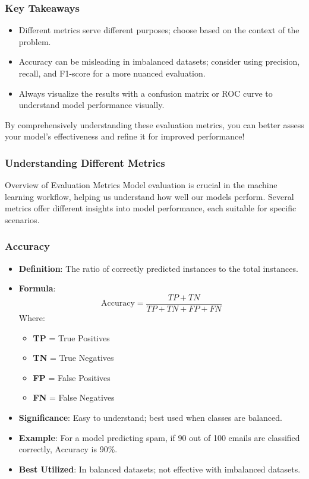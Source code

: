 \documentclass[aspectratio=169]{beamer}
\begin{document}
\begin{frame}[fragile]
    \frametitle{Key Takeaways}
    \begin{itemize}
        \item Different metrics serve different purposes; choose based on the context of the problem.
        \item Accuracy can be misleading in imbalanced datasets; consider using precision, recall, and F1-score for a more nuanced evaluation.
        \item Always visualize the results with a confusion matrix or ROC curve to understand model performance visually.
    \end{itemize}
    By comprehensively understanding these evaluation metrics, you can better assess your model's effectiveness and refine it for improved performance!
\end{frame}

\begin{frame}[fragile]
    \frametitle{Understanding Different Metrics}
    \begin{block}{Overview of Evaluation Metrics}
        Model evaluation is crucial in the machine learning workflow, helping us understand how well our models perform.
        Several metrics offer different insights into model performance, each suitable for specific scenarios.
    \end{block}
\end{frame}

\begin{frame}[fragile]
    \frametitle{Accuracy}
    \begin{itemize}
        \item \textbf{Definition}: The ratio of correctly predicted instances to the total instances.
        \item \textbf{Formula}:
        \begin{equation}
        \text{Accuracy} = \frac{TP + TN}{TP + TN + FP + FN}
        \end{equation}
        Where:
        \begin{itemize}
            \item \textbf{TP} = True Positives
            \item \textbf{TN} = True Negatives
            \item \textbf{FP} = False Positives
            \item \textbf{FN} = False Negatives
        \end{itemize}
        \item \textbf{Significance}: Easy to understand; best used when classes are balanced.
        \item \textbf{Example}: For a model predicting spam, if 90 out of 100 emails are classified correctly, Accuracy is 90\%.
        \item \textbf{Best Utilized}: In balanced datasets; not effective with imbalanced datasets.
    \end{itemize}
\end{frame}
\end{document}
